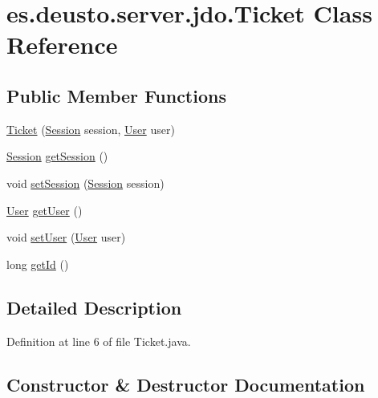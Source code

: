 \hypertarget{classes_1_1deusto_1_1server_1_1jdo_1_1_ticket}{}\section{es.\+deusto.\+server.\+jdo.\+Ticket Class Reference}
\label{classes_1_1deusto_1_1server_1_1jdo_1_1_ticket}
\subsection*{Public Member Functions}
\begin{DoxyCompactItemize}
\item 
\mbox{\hyperlink{classes_1_1deusto_1_1server_1_1jdo_1_1_ticket_ab35ef1ba4cc7f56426ccac5afcf29a01}{Ticket}} (\mbox{\hyperlink{classes_1_1deusto_1_1server_1_1jdo_1_1_session}{Session}} session, \mbox{\hyperlink{classes_1_1deusto_1_1server_1_1jdo_1_1_user}{User}} user)
\item 
\mbox{\hyperlink{classes_1_1deusto_1_1server_1_1jdo_1_1_session}{Session}} \mbox{\hyperlink{classes_1_1deusto_1_1server_1_1jdo_1_1_ticket_a60d6aebd66fee1d5d0ebde52540dcac9}{get\+Session}} ()
\item 
void \mbox{\hyperlink{classes_1_1deusto_1_1server_1_1jdo_1_1_ticket_a175ab896194b8a3734e335ff63440151}{set\+Session}} (\mbox{\hyperlink{classes_1_1deusto_1_1server_1_1jdo_1_1_session}{Session}} session)
\item 
\mbox{\hyperlink{classes_1_1deusto_1_1server_1_1jdo_1_1_user}{User}} \mbox{\hyperlink{classes_1_1deusto_1_1server_1_1jdo_1_1_ticket_a6c4819e9c6938564059c7957bf6a01d1}{get\+User}} ()
\item 
void \mbox{\hyperlink{classes_1_1deusto_1_1server_1_1jdo_1_1_ticket_a072a5e49ddc7060bd6cb521e90d15908}{set\+User}} (\mbox{\hyperlink{classes_1_1deusto_1_1server_1_1jdo_1_1_user}{User}} user)
\item 
long \mbox{\hyperlink{classes_1_1deusto_1_1server_1_1jdo_1_1_ticket_a9dadf081db69123f90cfe2cb9f7c0870}{get\+Id}} ()
\end{DoxyCompactItemize}


\subsection{Detailed Description}


Definition at line 6 of file Ticket.\+java.



\subsection{Constructor \& Destructor Documentation}
\mbox{\label{classes_1_1deusto_1_1server_1_1jdo_1_1_ticket_ab35ef1ba4cc7f56426ccac5afcf29a01}} 
